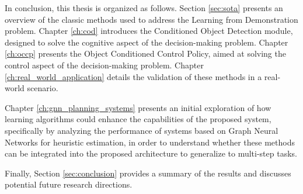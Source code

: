 In conclusion, this thesis is organized as follows. Section \ref{sec:sota} presents an overview of the classic methods used to address the Learning from Demonstration problem. Chapter \ref{ch:cod} introduces the Conditioned Object Detection module, designed to solve the cognitive aspect of the decision-making problem. Chapter \ref{ch:occp} presents the Object Conditioned Control Policy, aimed at solving the control aspect of the decision-making problem. Chapter \ref{ch:real_world_application} details the validation of these methods in a real-world scenario. 

Chapter \ref{ch:gnn_planning_systems} presents an initial exploration of how learning algorithms could enhance the capabilities of the proposed system, specifically by analyzing the performance of systems based on Graph Neural Networks for heuristic estimation, in order to understand whether these methods can be integrated into the proposed architecture to generalize to multi-step tasks.

Finally, Section \ref{sec:conclusion} provides a summary of the results and discusses potential future research directions.


